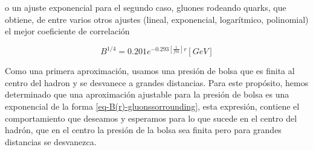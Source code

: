 o un ajuste exponencial para el segundo caso, gluones rodeando quarks, que obtiene, de entre varios otros ajustes (lineal, exponencial, logarítmico, polinomial) el mejor coeficiente de correlación

\begin{equation}\label{eq-B(r)-gluonssorrounding}
{B}^{1/4} = 0.201  {e}^{-0.293\left[\frac{1}{fm}\right]r} \left[{GeV}\right]
\end{equation}

Como una primera aproximación, usamos una presión de bolsa que es finita al centro del hadron y se desvanece a grandes distancias. Para este propósito, hemos determinado que una aproximación ajustable para la presión de bolsa es una exponencial de la forma \eqref{eq-B(r)-gluonssorrounding}, esta expresión, contiene el comportamiento que deseamos y esperamos para lo que sucede en el centro del hadrón, que en el centro la presión de la bolsa sea finita pero para grandes distancias se desvanezca.